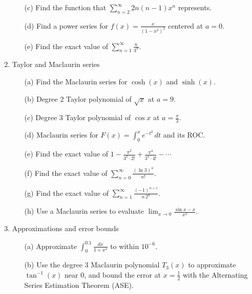 \documentclass[12pt]{article}
\begin{document}
\begin{enumerate}
\begin{enumerate}
\item[(c)] Find the function that $\sum_{n=2}^\infty2n(n-1)x^n$ represents.

\item[(d)] Find a power series for $f(x)=\frac{x}{(1-x^2)^2}$ centered at $a=0$.

\item[(e)] Find the exact value of $\sum_{n=1}^\infty\frac{n}{3^n}$.

\end{enumerate}

\setcounter{enumi}{27}
\item Taylor and Maclaurin series
\begin{enumerate}
\item[(a)] Find the Maclaurin series for $\cosh(x)$ and $\sinh(x)$.

\item[(b)] Degree 2 Taylor polynomial of $\sqrt x$ at $a=9$.

\item[(c)] Degree 3 Taylor polynomial of $\cos x$ at $a=\frac{\pi}{3}$.

\item[(d)] Maclaurin series for $F(x)=\int_0^xe^{-t^2}\,dt$ and its ROC.

\item[(e)] Find the exact value of $1-\frac{\pi^2}{3^2\cdot2!}+\frac{\pi^4}{3^4\cdot4!}-\cdots$

\item[(f)] Find the exact value of $\sum_{n=0}^\infty\frac{(\ln3)^n}{n!}$.

\item[(g)] Find the exact value of $\sum_{n=1}^\infty\frac{(-1)^{n+1}}{n\,2^n}$.

\item[(h)] Use a Maclaurin series to evaluate $\lim_{x\to0}\frac{\sin x-x}{x^3}$.

\end{enumerate}

\setcounter{enumi}{28}
\item Approximations and error bounds
\begin{enumerate}
\item[(a)] Approximate $\int_0^{0.1}\frac{dx}{1+x^4}$ to within $10^{-6}$.

\item[(b)] Use the degree 3 Maclaurin polynomial $T_3(x)$ to approximate $\tan^{-1}(x)$ near $0$, and bound the error at $x=\frac12$ with the Alternating Series Estimation Theorem (ASE).


\end{enumerate}
\end{enumerate}
\end{document}
